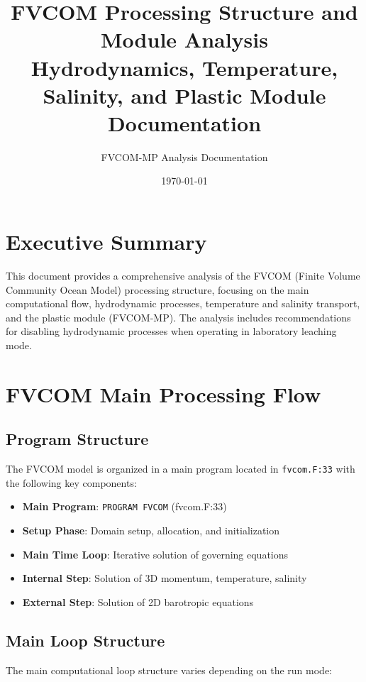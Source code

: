 \documentclass[12pt,a4paper]{article}
\title{FVCOM Processing Structure and Module Analysis\\
\large{Hydrodynamics, Temperature, Salinity, and Plastic Module Documentation}}
\author{FVCOM-MP Analysis Documentation}
\date{\today}
\begin{document}
\maketitle

\tableofcontents
\newpage

\section{Executive Summary}

This document provides a comprehensive analysis of the FVCOM (Finite Volume Community Ocean Model) processing structure, focusing on the main computational flow, hydrodynamic processes, temperature and salinity transport, and the plastic module (FVCOM-MP). The analysis includes recommendations for disabling hydrodynamic processes when operating in laboratory leaching mode.

\section{FVCOM Main Processing Flow}

\subsection{Program Structure}

The FVCOM model is organized in a main program located in \texttt{fvcom.F:33} with the following key components:

\begin{itemize}
    \item \textbf{Main Program}: \texttt{PROGRAM FVCOM} (fvcom.F:33)
    \item \textbf{Setup Phase}: Domain setup, allocation, and initialization
    \item \textbf{Main Time Loop}: Iterative solution of governing equations
    \item \textbf{Internal Step}: Solution of 3D momentum, temperature, salinity
    \item \textbf{External Step}: Solution of 2D barotropic equations
\end{itemize}

\subsection{Main Loop Structure}

The main computational loop structure varies depending on the run mode:
\end{document}
